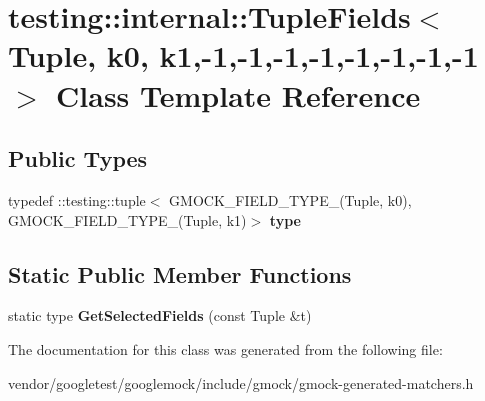 \hypertarget{classtesting_1_1internal_1_1TupleFields_3_01Tuple_00_01k0_00_01k1_00-1_00-1_00-1_00-1_00-1_00-1_00-1_00-1_01_4}{}\section{testing\+:\+:internal\+:\+:Tuple\+Fields$<$ Tuple, k0, k1,-\/1,-\/1,-\/1,-\/1,-\/1,-\/1,-\/1,-\/1 $>$ Class Template Reference}
\label{classtesting_1_1internal_1_1TupleFields_3_01Tuple_00_01k0_00_01k1_00-1_00-1_00-1_00-1_00-1_00-1_00-1_00-1_01_4}
\subsection*{Public Types}
\begin{DoxyCompactItemize}
\item 
typedef \+::testing\+::tuple$<$ G\+M\+O\+C\+K\+\_\+\+F\+I\+E\+L\+D\+\_\+\+T\+Y\+P\+E\+\_\+(Tuple, k0), G\+M\+O\+C\+K\+\_\+\+F\+I\+E\+L\+D\+\_\+\+T\+Y\+P\+E\+\_\+(Tuple, k1)$>$ {\bfseries type}\hypertarget{classtesting_1_1internal_1_1TupleFields_3_01Tuple_00_01k0_00_01k1_00-1_00-1_00-1_00-1_00-1_00-1_00-1_00-1_01_4_a3b11f1a0cd0218f2d102b57c19cde352}{}\label{classtesting_1_1internal_1_1TupleFields_3_01Tuple_00_01k0_00_01k1_00-1_00-1_00-1_00-1_00-1_00-1_00-1_00-1_01_4_a3b11f1a0cd0218f2d102b57c19cde352}

\end{DoxyCompactItemize}
\subsection*{Static Public Member Functions}
\begin{DoxyCompactItemize}
\item 
static type {\bfseries Get\+Selected\+Fields} (const Tuple \&t)\hypertarget{classtesting_1_1internal_1_1TupleFields_3_01Tuple_00_01k0_00_01k1_00-1_00-1_00-1_00-1_00-1_00-1_00-1_00-1_01_4_a97c0bf10d84e8773ff13857e287f9913}{}\label{classtesting_1_1internal_1_1TupleFields_3_01Tuple_00_01k0_00_01k1_00-1_00-1_00-1_00-1_00-1_00-1_00-1_00-1_01_4_a97c0bf10d84e8773ff13857e287f9913}

\end{DoxyCompactItemize}


The documentation for this class was generated from the following file\+:\begin{DoxyCompactItemize}
\item 
vendor/googletest/googlemock/include/gmock/gmock-\/generated-\/matchers.\+h\end{DoxyCompactItemize}
